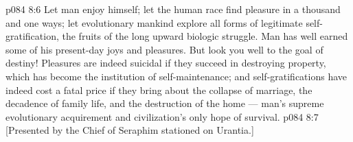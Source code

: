 \vs p084 8:6 \pc Let man enjoy himself; let the human race find pleasure in a thousand and one ways; let evolutionary mankind explore all forms of legitimate self\hyp{}gratification, the fruits of the long upward biologic struggle. Man has well earned some of his present\hyp{}day joys and pleasures. But look you well to the goal of destiny! Pleasures are indeed suicidal if they succeed in destroying property, which has become the institution of self\hyp{}maintenance; and self\hyp{}gratifications have indeed cost a fatal price if they bring about the collapse of marriage, the decadence of family life, and the destruction of the home --- man’s supreme evolutionary acquirement and civilization’s only hope of survival.
\vsetoff
\vs p084 8:7 [Presented by the Chief of Seraphim stationed on Urantia.]
